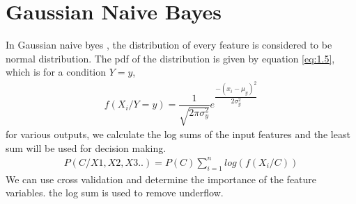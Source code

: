 \documentclass{article}
\begin{document}
   \section{Gaussian Naive Bayes}
   In Gaussian naive byes , the distribution of every feature is considered to be normal distribution. The pdf of the distribution is given by equation \eqref{eq:1.5}, which is for a condition $Y=y$,
   \begin{align}
       f(X_i/Y=y)=\dfrac{1}{\sqrt{2\pi{\sigma_y^2}}}e^{\dfrac{-{(x_i-\mu_y)}^2}{2\sigma_y^2}}\label{eq:1.5}
   \end{align}
   for various outputs, we calculate the log sums of the input features and the least sum will be used for decision making.
   \begin{align}
       P(C/X1,X2,X3..)=P(C)\sum_{i=1}^nlog{(f(X_i/C))}\label{eq:1.4}
   \end{align}
   We can use cross validation and determine the importance of the feature variables. the log sum is used to remove underflow.
\end{document}
